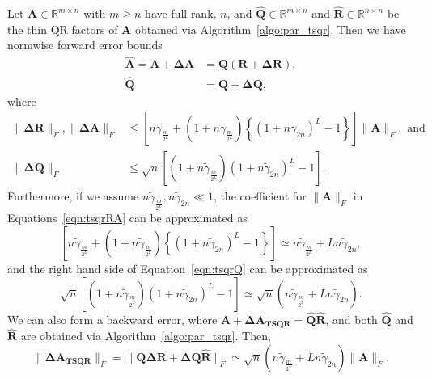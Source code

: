 \documentclass[review,onefignum,onetabnum]{siamart190516}
\newcommand{\R}{\mathbb{R}}
\newcommand{\bb}[1]{\mathbf{#1}}
\begin{document}
\begin{theorem}
	\label{thm:moriTSQR}
	Let $\bb{A}\in\R^{m\times n}$ with $m\geq n$ have full rank, $n$, and $\hat{\bb{Q}}\in\R^{m\times n}$ and $\hat{\bb{R}}\in\R^{n\times n}$ be the thin QR factors of $\bb{A}$ obtained via Algorithm~\ref{algo:par_tsqr}. 
	Then we have normwise forward error bounds
	\begin{align*}
	\hat{\bb{A}} = \bb{A} +\bb{\Delta A} &=  \bb{Q}(\bb{R} + \bb{\Delta R}),\\
	\hat{\bb{Q}} &= \bb{Q} + \bb{\Delta Q},
	\end{align*}
	where
	\begin{align}
	\|\bb{\Delta R}\|_F, \|\bb{\Delta A}\|_F &\leq \left[n\tilde{\gamma}_{ \frac{m}{2^L}}+(1+n\tilde{\gamma}_{ \frac{m}{2^L}})\left\{(1+n\tilde{\gamma}_{ 2n})^L-1\right\}\right]\|\bb{A}\|_F, \text{ and} \label{eqn:tsqrRA}\\
	\|\bb{\Delta Q}\|_F &\leq \sqrt{n}\left[(1+n\tilde{\gamma}_{ \frac{m}{2^L}})(1+n\tilde{\gamma}_{ 2n})^L -1\right].\label{eqn:tsqrQ}
	\end{align}
	Furthermore, if we assume $n\tilde{\gamma}_{ \frac{m}{2^L}}, n\tilde{\gamma}_{ 2n} \ll 1$, the coefficient for $\|\bb{A}\|_F$ in Equations~\ref{eqn:tsqrRA} can be approximated as
	\begin{equation}
	\left[n\tilde{\gamma}_{ \frac{m}{2^L}}+(1+n\tilde{\gamma}_{ \frac{m}{2^L}})\left\{(1+n\tilde{\gamma}_{ 2n})^L-1\right\}\right] \simeq n\tilde{\gamma}_{ \frac{m}{2^L}} + Ln\tilde{\gamma}_{ 2n}, %
	\end{equation}
	and the right hand side of Equation~\ref{eqn:tsqrQ} can be approximated as
	\begin{equation}
	 \sqrt{n}\left[(1+n\tilde{\gamma}_{ \frac{m}{2^L}})(1+n\tilde{\gamma}_{ 2n})^L -1\right]\simeq \sqrt{n}\left(n\tilde{\gamma}_{ \frac{m}{2^L}} + Ln\tilde{\gamma}_{ 2n}\right). %
	\end{equation}
	We can also form a backward error, where $\bb{A}+\bb{\Delta \bb{A}_{\text{TSQR}}} = \hat{\bb{Q}}\hat{\bb{R}}$, and both $\hat{\bb{Q}}$ and $\hat{\bb{R}}$ are obtained via Algorithm~\ref{algo:par_tsqr}.
	Then,
	\begin{equation}
	\|\bb{\Delta \bb{A}_{\text{TSQR}}}\|_F =\|\bb{Q \Delta R} + \bb{\Delta Q}\hat{\bb{R}}\|_F \simeq \sqrt{n}\left(n\tilde{\gamma}_{ \frac{m}{2^L}} + Ln\tilde{\gamma}_{ 2n}\right)\|\bb{A}\|_F.
	\end{equation}
\end{theorem}
\end{document}

